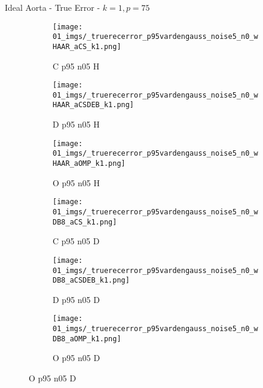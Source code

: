 \begin{frame}{Ideal Aorta - True Error - $k=1,p=75$}{}
\begin{figure}
\begin{subfigure}{0.13\textwidth}
\texttt{[image: 01\_imgs/\_truerecerror\_p95vardengauss\_noise5\_n0\_wHAAR\_aCS\_k1.png]}
\caption*{\tiny C p95 n05 H}
\end{subfigure}
\begin{subfigure}{0.13\textwidth}
\texttt{[image: 01\_imgs/\_truerecerror\_p95vardengauss\_noise5\_n0\_wHAAR\_aCSDEB\_k1.png]}
\caption*{\tiny D p95 n05 H}
\end{subfigure}
\begin{subfigure}{0.13\textwidth}
\texttt{[image: 01\_imgs/\_truerecerror\_p95vardengauss\_noise5\_n0\_wHAAR\_aOMP\_k1.png]}
\caption*{\tiny O p95 n05 H}
\end{subfigure}
\begin{subfigure}{0.13\textwidth}
\texttt{[image: 01\_imgs/\_truerecerror\_p95vardengauss\_noise5\_n0\_wDB8\_aCS\_k1.png]}
\caption*{\tiny C p95 n05 D}
\end{subfigure}
\begin{subfigure}{0.13\textwidth}
\texttt{[image: 01\_imgs/\_truerecerror\_p95vardengauss\_noise5\_n0\_wDB8\_aCSDEB\_k1.png]}
\caption*{\tiny D p95 n05 D}
\end{subfigure}
\begin{subfigure}{0.13\textwidth}
\texttt{[image: 01\_imgs/\_truerecerror\_p95vardengauss\_noise5\_n0\_wDB8\_aOMP\_k1.png]}
\caption*{\tiny O p95 n05 D}
\end{subfigure}

\vspace{5pt}


\end{figure}
\end{frame}
